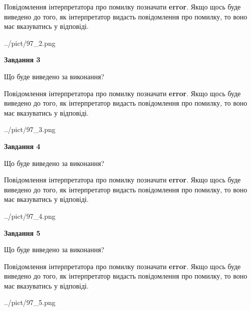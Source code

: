 \documentclass[12pt, ukrainian]{article}
\begin{document}
{\begin {large}
Повідомлення інтерпретатора про помилку позначати \textbf{error}.
Якщо щось буде виведено до того, як інтерпретатор видасть повідомлення про помилку, 
то воно має вказуватись у відповіді. \par


\begin{center}
	{../pict/97_2.png}
\end{center}
\newpage

{\begin {center}\textbf{Завдання 3}\end {center}}\par
Що буде виведено за виконання?

Повідомлення інтерпретатора про помилку позначати \textbf{error}.
Якщо щось буде виведено до того, як інтерпретатор видасть повідомлення про помилку, 
то воно має вказуватись у відповіді. \par


\begin{center}
	{../pict/97_3.png}
\end{center}
\newpage

{\begin {center}\textbf{Завдання 4}\end {center}}\par
Що буде виведено за виконання?

Повідомлення інтерпретатора про помилку позначати \textbf{error}.
Якщо щось буде виведено до того, як інтерпретатор видасть повідомлення про помилку, 
то воно має вказуватись у відповіді. \par


\begin{center}
	{../pict/97_4.png}
\end{center}
\newpage

{\begin {center}\textbf{Завдання 5}\end {center}}\par
Що буде виведено за виконання?

Повідомлення інтерпретатора про помилку позначати \textbf{error}.
Якщо щось буде виведено до того, як інтерпретатор видасть повідомлення про помилку, 
то воно має вказуватись у відповіді. \par


\begin{center}
	{../pict/97_5.png}
\end{center}
\newpage


\end{large}}
\end{document}
